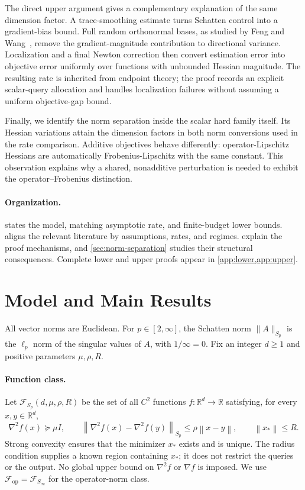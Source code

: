 \documentclass[11pt,a4paper]{article}
\newcommand{\R}{\mathbb R}
\newcommand{\Fop}{\mathcal F_{\mathrm{op}}}
\newcommand{\FS}{\mathcal F_{S_p}}
\newcommand{\norm}[1]{\left\lVert#1\right\rVert}
\theoremstyle{definition}
\theoremstyle{remark}
\begin{document}
The direct upper argument gives a complementary explanation of the same dimension factor. A trace-smoothing estimate turns Schatten control into a gradient-bias bound. Full random orthonormal bases, as studied by Feng and Wang~\cite{Feng2023}, remove the gradient-magnitude contribution to directional variance. Localization and a final Newton correction then convert estimation error into objective error uniformly over functions with unbounded Hessian magnitude. The resulting rate is inherited from endpoint theory; the proof records an explicit scalar-query allocation and handles localization failures without assuming a uniform objective-gap bound.

Finally, we identify the norm separation inside the scalar hard family itself. Its Hessian variations attain the dimension factors in both norm conversions used in the rate comparison. Additive objectives behave differently: operator-Lipschitz Hessians are automatically Frobenius-Lipschitz with the same constant. This observation explains why a shared, nonadditive perturbation is needed to exhibit the operator--Frobenius distinction.

\paragraph{Organization.}
 states the model, matching asymptotic rate, and finite-budget lower bounds.  aligns the relevant literature by assumptions, rates, and regimes.  explain the proof mechanisms, and \cref{sec:norm-separation} studies their structural consequences. Complete lower and upper proofs appear in \cref{app:lower,app:upper}.

\section{Model and Main Results}
\label{sec:model}
All vector norms are Euclidean. For $p\in[2,\infty]$, the Schatten norm $\|A\|_{S_p}$ is the $\ell_p$ norm of the singular values of $A$, with $1/\infty=0$. Fix an integer $d\ge1$ and positive parameters $\mu,\rho,R$.

\paragraph{Function class.}
Let $\FS(d,\mu,\rho,R)$ be the set of all $C^2$ functions $f:\R^d\to\R$ satisfying, for every $x,y\in\R^d$,
\begin{equation}\label{eq:class}
 \nabla^2 f(x)\succeq\mu I,\qquad
 \norm{\nabla^2 f(x)-\nabla^2 f(y)}_{S_p}\le\rho\norm{x-y},\qquad
 \norm{x_*}\le R.
\end{equation}
Strong convexity ensures that the minimizer $x_*$ exists and is unique. The radius condition supplies a known region containing $x_*$; it does not restrict the queries or the output. No global upper bound on $\nabla^2 f$ or $\nabla f$ is imposed. We use $\Fop=\mathcal F_{S_\infty}$ for the operator-norm class.
\end{document}
